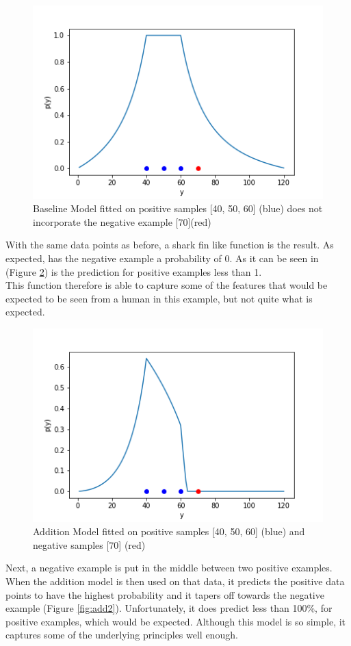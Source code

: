 \documentclass[12pt, ]{scrartcl}
\begin{document}
\begin{multicols}{2}
\begin{figure}[H]
	\includegraphics[scale=0.5]{graphics/baseline.png}
	\caption{Baseline Model fitted on positive samples [40, 50, 60] (blue) does not incorporate the negative example [70](red) }
	\label{fig:baseline}
\end{figure}

With the same data points as before, a shark fin like function is the result. 
As expected, has the negative example a probability of 0. As it can be seen in (Figure \ref{fig:add1}) is the prediction for positive examples less than 1. \\
This function therefore is able to capture some of the features that would be expected to be seen from a human in this example, but not quite what is expected.
\begin{figure}[H]
	\includegraphics[scale=0.5]{graphics/addition_model}
	\caption{Addition Model fitted on positive samples [40, 50, 60] (blue) and negative samples [70] (red)}
	\label{fig:add1}
\end{figure}

Next, a negative example is put in the middle between two positive examples.
When the addition model is then used on that data, it predicts the positive data points to have the highest probability and it tapers off towards the negative example (Figure \ref{fig:add2}). 
Unfortunately, it does predict less than 100\%, for positive examples, which would be expected. 
Although this model is so simple, it captures some of the underlying principles well enough. 


\end{multicols}
\end{document}
